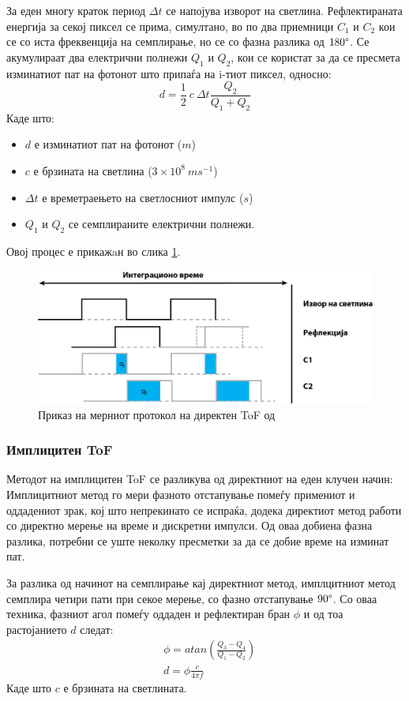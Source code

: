 \documentclass[11pt]{article}
\begin{document}
		    За еден многу краток период $ \Delta t $ се напојува изворот на светлина. Рефлектираната енергија за секој пиксел се прима, симултано, во по два приемници $C_1$ и $C_2$ кои се со иста фреквенција на семплирање, но се со фазна разлика од $180 \degree$. Се акумулираат два електрични полнежи $Q_1$ и  $Q_2$, кои се користат за да се пресмета изминатиот пат на фотонот што припаѓа на i-тиот пиксел, односно:
		    \begin{equation}
            d = \frac{1}{2} \ c\  \Delta t \frac{Q_2}{Q_1 + Q_2}
        \end{equation}
    Каде што:
		\begin{itemize}
			\item $d$ е изминатиот пат на фотонот ($m$)
			\item $c$ е брзината на светлина ($ 3 \times 10^8\ ms^{-1} $)
			\item $\Delta t$ е времетраењето на светлосниот импулс ($s$)
			\item $Q_1$ и $Q_2$ се семплираните електрични полнежи.
			\end{itemize}
    Овој процес е прикажaн во слика \ref{fig:impulseToF}.
		\begin{figure}[H]
			\includegraphics[width=0.75\linewidth]{./images/impulseToF.png}
			\centering
			\caption{Приказ на мерниот протокол на директен ToF од \cite{tofwhitepaper}}
			\label{fig:impulseToF}
			\end{figure}

	  \subsubsection{Имплицитен ToF}
		  Методот на имплицитен ToF се разликува од директниот на еден клучен начин: Имплицитниот метод го мери фазното отстапување помеѓу примениот и оддадениот зрак, кој што непрекинато се испраќа, додека директиот метод работи со директно мерење на време и дискретни импулси. Од оваа добиена фазна разлика, потребни се уште неколку пресметки за да се добие време на изминат пат.

		  За разлика од начинот на семплирање кај директниот метод, имплцитниот метод семплира четири пати при секое мерење, со фазно отстапување $90\degree$. Со оваа техника, фазниот агол помеѓу оддаден и рефлектиран бран $\phi$ и од тоа растојанието $d$ следат:
      \begin{align}
        & \phi = atan(\frac{Q_3 - Q_4}{Q_1 - Q_2}) \nonumber \\
        & d = \phi \frac{c}{4\pi f}
      \end{align}
      Каде што $c$ е брзината на светлината.
\end{document}
